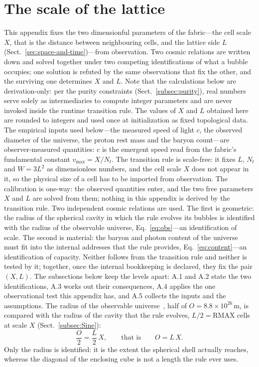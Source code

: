\documentclass[a4paper]{article}
\begin{document}
\section{The scale of the lattice\label{sec:Calculation-of-X}}
This appendix fixes the two dimensionful parameters of the fabric---the cell scale $X$, that is the distance between neighbouring cells, and the lattice side $L$ (Sect.~\ref{sec:space-and-time})---from observation.  Two cosmic relations are written down and solved together under two competing identifications of what a bubble occupies; one solution is refuted by the same observations that fix the other, and the surviving one determines $X$ and $L$.
Note that the calculations below are derivation-only: per the purity constraints (Sect.~\ref{subsec:purity}), real numbers serve solely as intermediaries to compute integer parameters and are never invoked inside the runtime transition rule.  The values of $X$ and $L$ obtained here are rounded to integers and used once at initialization as fixed topological data.
The empirical inputs used below---the measured speed of light $c$, the observed diameter of the universe, the proton rest mass and the baryon count---are observer-measured quantities: $c$ is the emergent speed read from the fabric's fundamental constant $v_{\max}=X/N_t$.  The transition rule is scale-free: it fixes $L$, $N_t$ and $W=3L^{2}$ as dimensionless numbers, and the cell scale $X$ does not appear in it, so the physical size of a cell has to be imported from observation.  The calibration is one-way: the observed quantities enter, and the two free parameters $X$ and $L$ are solved from them; nothing in this appendix is derived by the transition rule.
Two independent cosmic relations are used.  The first is geometric: the radius of the spherical cavity in which the rule evolves its bubbles is identified with the radius of the observable universe, Eq.~\eqref{eq:obs}---an identification of scale.  The second is material: the baryon and photon content of the universe must fit into the internal addresses that the rule provides, Eq.~\eqref{eq:content}---an identification of capacity.  Neither follows from the transition rule and neither is tested by it; together, once the internal bookkeeping is declared, they fix the pair $(X,L)$.  The subsections below keep the levels apart: A.1 and A.2 state the two identifications, A.3 works out their consequences, A.4 applies the one observational test this appendix has, and A.5 collects the inputs and the assumptions.
The radius of the observable universe~\cite{halpbern}, half of $O=8.8\times10^{26}$\,m, is compared with the radius of the cavity that the rule evolves, $L/2=\mathrm{RMAX}$ cells at scale $X$ (Sect.~\ref{subsec:Sine}):
\begin{equation}
\frac{O}{2}=\frac{L}{2}\,X,
\qquad\text{that is}\qquad
O=L\,X.\label{eq:obs}
\end{equation}
Only the radius is identified: it is the extent the spherical shell actually reaches, whereas the diagonal of the enclosing cube is not a length the rule ever uses.
\end{document}
